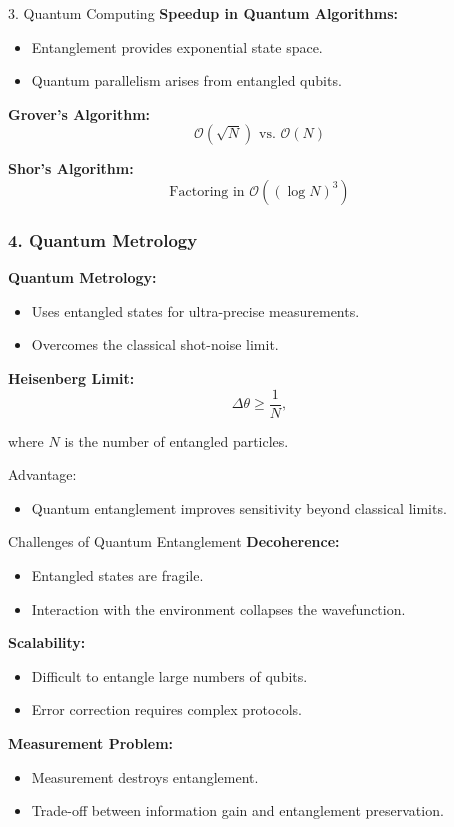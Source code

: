 \documentclass{beamer}
\begin{document}
\begin{frame}{3. Quantum Computing}
\textbf{Speedup in Quantum Algorithms:}
\begin{itemize}
    \item Entanglement provides exponential state space.
    \item Quantum parallelism arises from entangled qubits.
\end{itemize}

\textbf{Grover's Algorithm:}
\[
\mathcal{O}(\sqrt{N}) \text{ vs. } \mathcal{O}(N)
\]

\textbf{Shor's Algorithm:}
\[
\text{Factoring in } \mathcal{O}((\log N)^3)
\]
\end{frame}

\begin{frame}
\frametitle{4. Quantum Metrology}

\textbf{Quantum Metrology:}
\begin{itemize}
    \item Uses entangled states for ultra-precise measurements.
    \item Overcomes the classical shot-noise limit.
\end{itemize}

\textbf{Heisenberg Limit:}
\[
\Delta \theta \ge \frac{1}{N},
\]

where \( N \) is the number of entangled particles.  

\begin{block}{Advantage:}
\begin{itemize}
\item Quantum entanglement improves sensitivity beyond classical limits.
\end{itemize}
\end{block}
\end{frame}

\begin{frame}{Challenges of Quantum Entanglement}
\textbf{Decoherence:}
\begin{itemize}
    \item Entangled states are fragile.
    \item Interaction with the environment collapses the wavefunction.
\end{itemize}

\textbf{Scalability:}
\begin{itemize}
    \item Difficult to entangle large numbers of qubits.
    \item Error correction requires complex protocols.
\end{itemize}

\textbf{Measurement Problem:}
\begin{itemize}
    \item Measurement destroys entanglement.
    \item Trade-off between information gain and entanglement preservation.
\end{itemize}
\end{frame}
\end{document}
